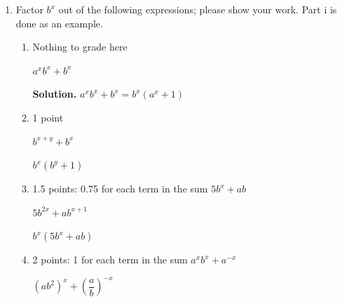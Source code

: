 \documentclass{article}
\begin{document}
\begin{enumerate}
\begin{enumerate}
  \item Factor $b^x$ out of the following expressions; please show your work. Part i is done as an example. 

    \begin{enumerate}
    \item

      \begin{grading}
        Nothing to grade here
      \end{grading}

      \begin{problem}
        $a^x b^x + b^x$
      \end{problem}

      \textbf{Solution.} $a^x b^x + b^x = b^x (a^x + 1)$

    \item

      \begin{grading}
        1 point
      \end{grading}

      \begin{problem}[\stretch{0.5}]
        $b^{x+y}+b^x$
      \end{problem}

      \begin{solution}
        $b^x(b^y+1)$
      \end{solution}

    \item

      \begin{grading}
        1.5 points: 0.75 for each term in the sum $5b^x + ab$
      \end{grading}

      \begin{problem}[\stretch{0.5}]
        $5b^{2x}+ab^{x+1}$
      \end{problem}

      \begin{solution}
        $b^x(5b^x+ab)$
      \end{solution}

    \item

      \begin{grading}
        2 points: 1 for each term in the sum $a^x b^x + a^{-x}$
      \end{grading}

      \begin{problem}[\vfill]
        $(ab^2)^x + \left(\dfrac{a}{b}\right)^{-x}$
      \end{problem}


\end{enumerate}
\end{enumerate}
\end{enumerate}
\end{document}
